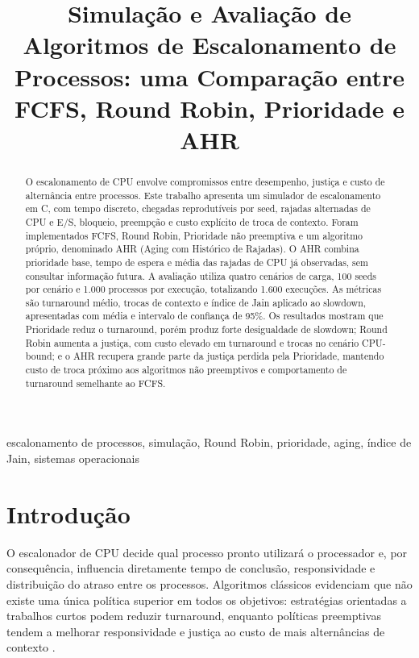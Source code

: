 \documentclass[conference]{IEEEtran}
\begin{document}
\title{Simulação e Avaliação de Algoritmos de Escalonamento de Processos: uma Comparação entre FCFS, Round Robin, Prioridade e AHR}

\author{
}

\maketitle

\begin{abstract}
O escalonamento de CPU envolve compromissos entre desempenho, justiça e custo de alternância entre processos. Este trabalho apresenta um simulador de escalonamento em C, com tempo discreto, chegadas reprodutíveis por seed, rajadas alternadas de CPU e E/S, bloqueio, preempção e custo explícito de troca de contexto. Foram implementados FCFS, Round Robin, Prioridade não preemptiva e um algoritmo próprio, denominado AHR (Aging com Histórico de Rajadas). O AHR combina prioridade base, tempo de espera e média das rajadas de CPU já observadas, sem consultar informação futura. A avaliação utiliza quatro cenários de carga, 100 seeds por cenário e 1.000 processos por execução, totalizando 1.600 execuções. As métricas são turnaround médio, trocas de contexto e índice de Jain aplicado ao slowdown, apresentadas com média e intervalo de confiança de 95\%. Os resultados mostram que Prioridade reduz o turnaround, porém produz forte desigualdade de slowdown; Round Robin aumenta a justiça, com custo elevado em turnaround e trocas no cenário CPU-bound; e o AHR recupera grande parte da justiça perdida pela Prioridade, mantendo custo de troca próximo aos algoritmos não preemptivos e comportamento de turnaround semelhante ao FCFS.
\end{abstract}

\begin{IEEEkeywords}
escalonamento de processos, simulação, Round Robin, prioridade, aging, índice de Jain, sistemas operacionais
\end{IEEEkeywords}

\section{Introdução}
O escalonador de CPU decide qual processo pronto utilizará o processador e, por consequência, influencia diretamente tempo de conclusão, responsividade e distribuição do atraso entre os processos. Algoritmos clássicos evidenciam que não existe uma única política superior em todos os objetivos: estratégias orientadas a trabalhos curtos podem reduzir turnaround, enquanto políticas preemptivas tendem a melhorar responsividade e justiça ao custo de mais alternâncias de contexto \cite{ostep}.
\end{document}
